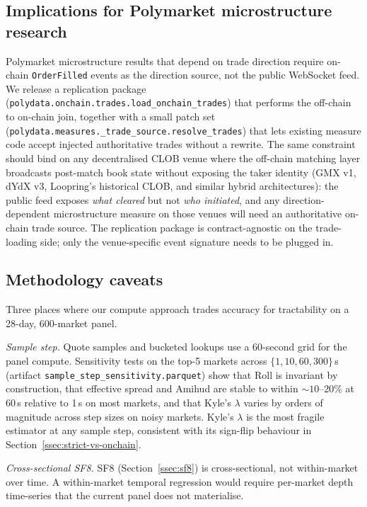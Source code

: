 \subsection{Implications for Polymarket microstructure research}\label{ssec:methodology}

Polymarket microstructure results that depend on trade direction
require on-chain \texttt{OrderFilled} events as the direction source,
not the public WebSocket feed. We release a replication package
(\texttt{polydata.\allowbreak onchain.\allowbreak trades.\allowbreak load\_onchain\_trades})
that performs the off-chain to on-chain join, together with a small
patch set
(\texttt{polydata.\allowbreak measures.\allowbreak \_trade\_source.\allowbreak resolve\_trades})
that lets existing measure code accept injected authoritative trades
without a rewrite. The same constraint should bind on any
decentralised CLOB venue where the off-chain matching layer
broadcasts post-match book state without exposing the taker
identity (GMX v1, dYdX v3, Loopring's historical CLOB, and similar
hybrid architectures): the public feed exposes \emph{what cleared}
but not \emph{who initiated}, and any direction-dependent
microstructure measure on those venues will need an authoritative
on-chain trade source. The replication package is contract-agnostic
on the trade-loading side; only the venue-specific event signature
needs to be plugged in.

\subsection{Methodology caveats}\label{ssec:methodology-caveats}

Three places where our compute approach trades accuracy for
tractability on a 28-day, 600-market panel.

\textit{Sample step.}
Quote samples and bucketed lookups use a 60-second grid for the panel
compute. Sensitivity tests on the top-5 markets across
$\{1, 10, 60, 300\}$\,s (artifact
\texttt{sample\_step\_sensitivity.parquet}) show that Roll is
invariant by construction, that effective spread and Amihud are
stable to within $\sim 10$--20\% at 60\,s relative to 1\,s on most
markets, and that Kyle's $\lambda$ varies by orders of magnitude
across step sizes on noisy markets. Kyle's $\lambda$ is the most
fragile estimator at any sample step, consistent with its
sign-flip behaviour in Section~\ref{ssec:strict-vs-onchain}.

\textit{Cross-sectional SF8.}
SF8 (Section~\ref{ssec:sf8}) is cross-sectional, not within-market
over time. A within-market temporal regression would require
per-market depth time-series that the current panel does not
materialise.

